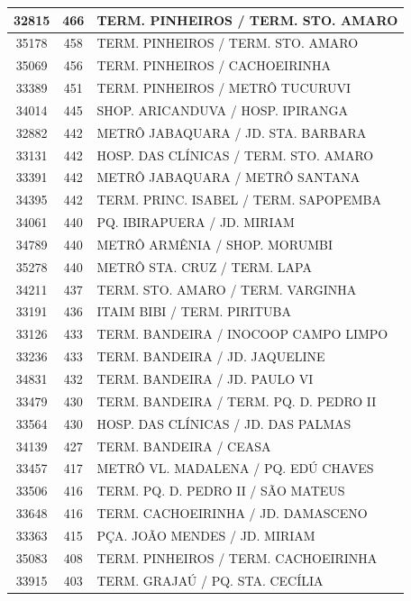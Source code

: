 \documentclass[
	12pt,				%
	oneside,			%
	a4paper,			%
	english,			%
	brazil				%
	]{abntex2ppgsi}
\begin{document}
\begin{apendicesenv}
\begin{longtable}{c|c|p{7cm}}
\hline
    32815 & 466   & TERM. PINHEIROS / TERM. STO. AMARO \\
\hline
    35178 & 458   & TERM. PINHEIROS / TERM. STO. AMARO \\
\hline
    35069 & 456   & TERM. PINHEIROS / CACHOEIRINHA \\
\hline
    33389 & 451   & TERM. PINHEIROS / METRÔ TUCURUVI \\
\hline
    34014 & 445   & SHOP. ARICANDUVA / HOSP. IPIRANGA \\
\hline
    32882 & 442   & METRÔ JABAQUARA / JD. STA. BARBARA \\
\hline
    33131 & 442   & HOSP. DAS CLÍNICAS / TERM. STO. AMARO \\
\hline
    33391 & 442   & METRÔ JABAQUARA / METRÔ SANTANA \\
\hline
    34395 & 442   & TERM. PRINC. ISABEL / TERM. SAPOPEMBA \\
\hline
    34061 & 440   & PQ. IBIRAPUERA / JD. MIRIAM \\
\hline
    34789 & 440   & METRÔ ARMÊNIA / SHOP. MORUMBI \\
\hline
    35278 & 440   & METRÔ STA. CRUZ / TERM. LAPA \\
\hline
    34211 & 437   & TERM. STO. AMARO / TERM. VARGINHA \\
\hline
    33191 & 436   & ITAIM BIBI / TERM. PIRITUBA \\
\hline
    33126 & 433   & TERM. BANDEIRA / INOCOOP CAMPO LIMPO \\
\hline
    33236 & 433   & TERM. BANDEIRA / JD. JAQUELINE \\
\hline
    34831 & 432   & TERM. BANDEIRA / JD. PAULO VI \\
\hline
    33479 & 430   & TERM. BANDEIRA / TERM. PQ. D. PEDRO II \\
\hline
    33564 & 430   & HOSP. DAS CLÍNICAS / JD. DAS PALMAS \\
\hline
    34139 & 427   & TERM. BANDEIRA / CEASA \\
\hline
    33457 & 417   & METRÔ VL. MADALENA / PQ. EDÚ CHAVES \\
\hline
    33506 & 416   & TERM. PQ. D. PEDRO II / SÃO MATEUS \\
\hline
    33648 & 416   & TERM. CACHOEIRINHA / JD. DAMASCENO \\
\hline
    33363 & 415   & PÇA. JOÃO MENDES / JD. MIRIAM \\
\hline
    35083 & 408   & TERM. PINHEIROS / TERM. CACHOEIRINHA \\
\hline
    33915 & 403   & TERM. GRAJAÚ / PQ. STA. CECÍLIA \\

\end{longtable}
\end{apendicesenv}
\end{document}
